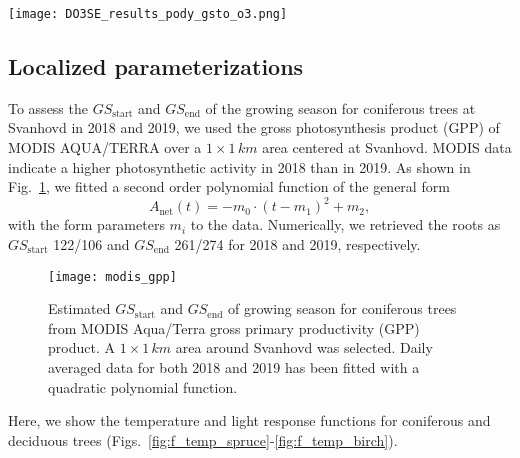 \documentclass[bg, manuscript]{copernicus}
\begin{document}
\begin{figure*}[t]
  \texttt{[image: DO3SE\_results\_pody\_gsto\_o3.png]}
  \caption{$\mathrm{DO_3SE}$ modeling results for mapping manual default parameterization. $\mathrm{POD_y}$ is shown over \unit{doy}, March--October. A flux threshold $y=1\,\unit{nmol\,m^{-2}\,s^{-1}}$ per projected leaf area (PLA) has been chosen.  are plotted on the same axis and scales as $G_\text{sto}^\text{leaf}$ but in units of $\unit{ppb}$. (a, b) deciduous tree; (c, d) coniferous tree; (e, f) perennial grassland. From left to right: 2018, 2019.}
  \label{fig:pody_mm_composit}
\end{figure*}

\subsection{Localized parameterizations}

To assess the $GS_\mathrm{start}$  and $GS_\mathrm{end}$ of the growing season for coniferous trees at Svanhovd in 2018 and 2019, we used the gross photosynthesis product (GPP) of MODIS AQUA/TERRA over a $1\times 1\,\unit{km}$ area centered at Svanhovd. MODIS data indicate a higher photosynthetic activity in 2018 than in 2019. As shown in Fig.~\ref{fig:modis_gpp}, we fitted a second order polynomial function of the general form
%
\begin{equation}
A_\mathrm{net}(t) =  -m_0\cdot(t-m_1)^2+m_2,
\end{equation}
%
with the form parameters $m_i$ to the data. Numerically, we retrieved the roots as $GS_\mathrm{start}$ 122/106 and $GS_\mathrm{end}$ 261/274 for 2018 and 2019, respectively. 

\begin{figure}[th]
  \texttt{[image: modis\_gpp]}
  \caption{Estimated $GS_\mathrm{start}$ and $GS_\mathrm{end}$ of growing season for coniferous trees from MODIS Aqua/Terra gross primary productivity (GPP) product. A $1\times 1\,\unit{km}$ area around Svanhovd was selected. Daily averaged data for both 2018 and 2019 has been fitted with a quadratic polynomial function.}
  \label{fig:modis_gpp}
\end{figure}

Here, we show the temperature and light response functions for coniferous and deciduous trees (Figs.~\ref{fig:f_temp_spruce}-\ref{fig:f_temp_birch}). 
\end{document}
